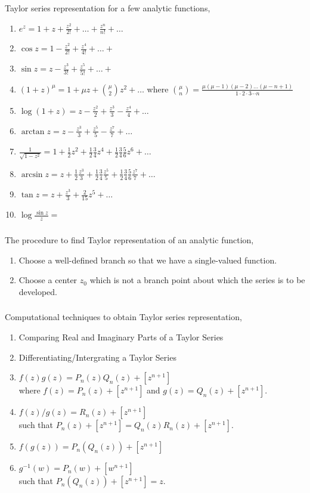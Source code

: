 Taylor series representation for a few analytic functions,
\begin{enumerate}
	\item $e^z = 1 + z + \frac{z^2}{2!} + \dots + \frac{z^n}{n!} + \dots$
	\item $\cos z = 1 - \frac{z^2}{2!} + \frac{z^4}{4!} + \dots + $
	\item $\sin z = z - \frac{z^3}{3!} + \frac{z^5}{5!} + \dots + $
	\item $(1+z)^\mu = 1 + \mu z + \binom{\mu}{2} z^2 + \dots$ where $\binom{\mu}{n} = \frac{\mu(\mu-1)(\mu-2)\dots(\mu-n+1)}{1 \cdot 2 \cdot 3 \cdots n}$
	\item $\log (1+z) = z - \frac{z^2}{2} + \frac{z^3}{3} - \frac{z^4}{4} + \dots$
	\item $\arctan z = z - \frac{z^3}{3} + \frac{z^5}{5} - \frac{z^7}{7} + \dots$
	\item $\frac{1}{\sqrt{1-z^2}} = 1 + \frac{1}{2}z^2 + \frac{1}{2}\frac{3}{4} z^4 + \frac{1}{2} \frac{3}{4} \frac{5}{6} z^6 + \dots$ 
	\item $\arcsin z = z + \frac{1}{2} \frac{z^3}{3} + \frac{1}{2} \frac{3}{4} \frac{z^5}{5} + \frac{1}{2} \frac{3}{4} \frac{5}{6} \frac{z^7}{7} + \dots$
	\item $\tan z = z + \frac{z^3}{3}+\frac{2}{15}z^5+\dots$
	\item $\log \frac{\sin z}{z} = $
\end{enumerate}

\subsubsection*{}
The procedure to find Taylor representation of an analytic function,
\begin{enumerate}
	\item Choose a well-defined branch so that we have a single-valued function.
	\item Choose a center $z_0$ which is not a branch point about which the series is to be developed.
\end{enumerate}

\subsubsection*{}
Computational techniques to obtain Taylor series representation,
\begin{enumerate}
	\item Comparing Real and Imaginary Parts of a Taylor Series
	\item Differentiating/Intergrating a Taylor Series
	\item $f(z)g(z) = P_n(z)Q_n(z) + [z^{n+1}]$ \\ where $f(z) = P_n(z) + [z^{n+1}]$ and $g(z) = Q_n(z) + [z^{n+1}]$.
	\item $f(z)/g(z) = R_n(z) + [z^{n+1}]$\\ such that $P_n(z) + [z^{n+1}] = Q_n(z)R_n(z) + [z^{n+1}]$.
	\item $f(g(z)) = P_n(Q_n(z)) + [z^{n+1}]$
	\item $g^{-1}(w) = P_n(w) + [w^{n+1}]$ \\ such that $P_n(Q_n(z)) + [z^{n+1}] = z$.
\end{enumerate}

